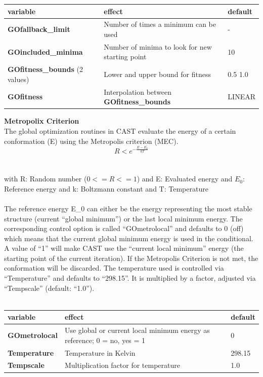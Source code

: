 \documentclass[10pt,a4paper]{article} %
\begin{document}
	\begin{longtable}{|p{3.5cm}|p{5cm}|p{2.5cm}|}
	variable & effect & default \\
		\hline
		\textbf{GOfallback\_limit} & Number of times a minimum can be used & - \\
		\textbf{GOincluded\_minima} & Number of minima to look for new starting point & 10 \\
		\textbf{GOfitness\_bounds} (2 values) & Lower and upper bound for fitness & 0.5 1.0 \\
		\textbf{GOfitness} & Interpolation between \textbf{GOfitness\_bounds} & LINEAR \\
	\end{longtable}

	\textbf{Metropolix Criterion} \\
	The global optimization routines in \ac{CAST} evaluate the energy of a certain conformation (E) using the Metropolis criterion (MEC).
	\begin{equation}
	R < e^{-\frac{E-E_0}{kT}}
	\end{equation}
	\\~\\
	with R: Random number ($0 <= R <= 1$)
	and E: Evaluated energy
	and $E_0$: Reference energy
	and k: Boltzmann constant
	and T: Temperature\\~\\
	
	The reference energy E\_0 can either be the energy representing the most stable structure (current ``global minimum'') or the last local minimum energy. The corresponding control option is called ``GOmetrolocal'' and defaults to 0 (off) which means that the current global minimum energy is used in the conditional. A value of ``1'' will make \ac{CAST} use the ``current local minimum'' energy (the starting point of the current iteration). If the Metropolis Criterion is not met, the conformation will be discarded.
	The temperature used is controlled via ``Temperature'' and defaults to ``298.15''. It is multiplied by a factor, adjusted via ``Tempscale'' (default: ``1.0'').\\~\\
	
	\begin{longtable}{|p{3.5cm}|p{5cm}|p{2.5cm}|}
		variable & effect & default\\
		\hline
		\textbf{GOmetrolocal} & Use global or current local minimum energy as reference; 0 = no, yes = 1 & 0 \\
		\textbf{Temperature} & Temperature in Kelvin & 298.15 \\
		\textbf{Tempscale} & Multiplication factor for temperature & 1.0
	\end{longtable}
	
\end{document}
